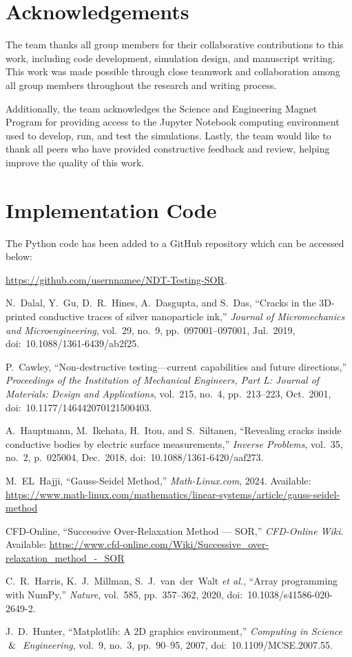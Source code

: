 \documentclass[reprint,amsmath,amssymb,aps]{revtex4-2}
\begin{document}
\section{Acknowledgements} 

The team thanks all group members for their collaborative contributions to this work, including code development, simulation design, and manuscript writing. This work was made possible through close teamwork and collaboration among all group members throughout the research and writing process. 

Additionally, the team acknowledges the Science and Engineering Magnet Program for providing access to the Jupyter Notebook computing environment used to develop, run, and test the simulations. Lastly, the team would like to thank all peers who have provided constructive feedback and review, helping improve the quality of this work. 

\appendix
\section{Implementation Code}
The Python code has been added to a GitHub repository which can be accessed below:

\url{https://github.com/usernnamee/NDT-Testing-SOR}.

\begin{thebibliography}{}
N.~Dalal, Y.~Gu, D.~R.~Hines, A.~Dasgupta, and S.~Das,
``Cracks in the 3D-printed conductive traces of silver nanoparticle ink,'' \textit{Journal of Micromechanics and Microengineering}, vol.~29, no.~9, pp.~097001--097001, Jul.~2019, doi:~10.1088/1361-6439/ab2f25.

P.~Cawley, ``Non-destructive testing---current capabilities and future directions,'' \textit{Proceedings of the Institution of Mechanical Engineers, Part L: Journal of Materials: Design and Applications}, vol.~215, no.~4, pp.~213--223, Oct.~2001,
doi:~10.1177/146442070121500403.

A.~Hauptmann, M.~Ikehata, H.~Itou, and S.~Siltanen,
``Revealing cracks inside conductive bodies by electric surface measurements,'' \textit{Inverse Problems}, vol.~35, no.~2, p.~025004, Dec.~2018, doi:~10.1088/1361-6420/aaf273.

M.~EL~Hajji,
``Gauss-Seidel Method,'' \textit{Math-Linux.com}, 2024.
Available: \url{https://www.math-linux.com/mathematics/linear-systems/article/gauss-seidel-method}

CFD-Online,
``Successive Over-Relaxation Method --- SOR,'' \textit{CFD-Online Wiki}.
Available: \url{https://www.cfd-online.com/Wiki/Successive_over-relaxation_method_-_SOR}

C.~R.~Harris, K.~J.~Millman, S.~J.~van~der~Walt \textit{et al.},
``Array programming with NumPy,'' \textit{Nature}, vol.~585, pp.~357--362, 2020, doi:~10.1038/s41586-020-2649-2.

J.~D.~Hunter,
``Matplotlib: A 2D graphics environment,'' \textit{Computing in Science  $\And$ Engineering}, vol.~9, no.~3, pp.~90--95, 2007, doi:~10.1109/MCSE.2007.55.


\end{thebibliography}
\end{document}
